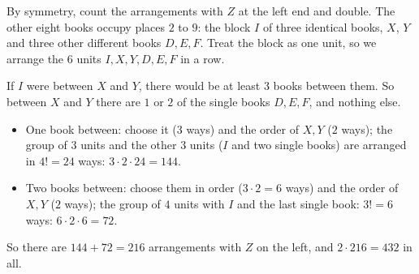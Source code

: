 By symmetry, count the arrangements with $Z$ at the left end and double. The other eight books occupy places $2$ to $9$: the block $I$ of three identical books, $X$, $Y$ and three other different books $D,E,F$. Treat the block as one unit, so we arrange the $6$ units $I,X,Y,D,E,F$ in a row.

If $I$ were between $X$ and $Y$, there would be at least $3$ books between them. So between $X$ and $Y$ there are $1$ or $2$ of the single books $D,E,F$, and nothing else.
\begin{itemize}
\item One book between: choose it ($3$ ways) and the order of $X,Y$ ($2$ ways); the group of $3$ units and the other $3$ units ($I$ and two single books) are arranged in $4!=24$ ways: $3\cdot2\cdot24=144$.
\item Two books between: choose them in order ($3\cdot2=6$ ways) and the order of $X,Y$ ($2$ ways); the group of $4$ units with $I$ and the last single book: $3!=6$ ways: $6\cdot2\cdot6=72$.
\end{itemize}
So there are $144+72=216$ arrangements with $Z$ on the left, and $2\cdot216=\boxed{432}$ in all.
